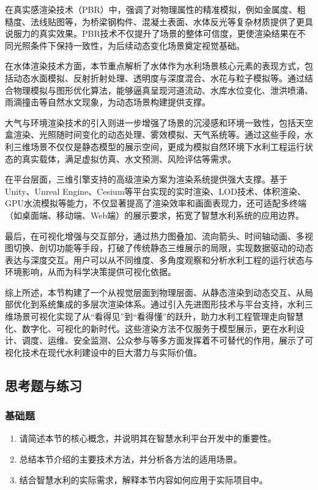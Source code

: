 在真实感渲染技术（PBR）中，强调了对物理属性的精准模拟，例如金属度、粗糙度、法线贴图等，为桥梁钢构件、混凝土表面、水体反光等复杂材质提供了更具说服力的真实效果。PBR技术不仅提升了场景的整体可信度，更使渲染结果在不同光照条件下保持一致性，为后续动态变化场景奠定视觉基础。

在水体渲染技术方面，本节重点解析了水体作为水利场景核心元素的表现方式，包括动态水面模拟、反射折射处理、透明度与深度混合、水花与粒子模拟等。通过结合物理模拟与图形优化算法，能够逼真呈现河道流动、水库水位变化、泄洪喷涌、雨滴撞击等自然水文现象，为动态场景构建提供支撑。

大气与环境渲染技术的引入则进一步增强了场景的沉浸感和环境一致性，包括天空盒渲染、光照随时间变化的动态处理、雾效模拟、天气系统等。通过这些手段，水利三维场景不仅仅是静态模型的展示空间，更成为模拟自然环境下水利工程运行状态的真实载体，满足虚拟仿真、水文预测、风险评估等需求。

在平台层面，三维引擎支持的高级渲染方案为渲染系统提供强大支撑。基于Unity、Unreal Engine、Cesium等平台实现的实时渲染、LOD技术、体积渲染、GPU水流模拟等能力，不仅显著提高了渲染效率和画面表现力，还可适配多终端（如桌面端、移动端、Web端）的展示要求，拓宽了智慧水利系统的应用边界。

最后，在可视化增强与交互部分，通过热力图叠加、流向箭头、时间轴动画、多视图切换、剖切功能等手段，打破了传统静态三维展示的局限，实现数据驱动的动态表达与深度交互。用户可以从不同维度、多角度观察和分析水利工程的运行状态与环境影响，从而为科学决策提供可视化依据。

综上所述，本节构建了一个从视觉层面到物理层面、从静态渲染到动态交互、从局部优化到系统集成的多层次渲染体系。通过引入先进图形技术与平台支持，水利三维场景可视化实现了从``看得见''到``看得懂''的跃升，助力水利工程管理走向智慧化、数字化、可视化的新时代。这些渲染方法不仅服务于模型展示，更在水利设计、调度、运维、安全监测、公众参与等多方面发挥着不可替代的作用，展示了可视化技术在现代水利建设中的巨大潜力与实际价值。

\subsection{思考题与练习}\label{ux601dux8003ux9898ux4e0eux7ec3ux4e60-6}

\subsubsection{基础题}\label{ux57faux7840ux9898-6}

\begin{enumerate}
\def\labelenumi{\arabic{enumi}.}
\tightlist
\item
  请简述本节的核心概念，并说明其在智慧水利平台开发中的重要性。
\item
  总结本节介绍的主要技术方法，并分析各方法的适用场景。
\item
  结合智慧水利的实际需求，解释本节内容如何应用于实际项目中。
\end{enumerate}

